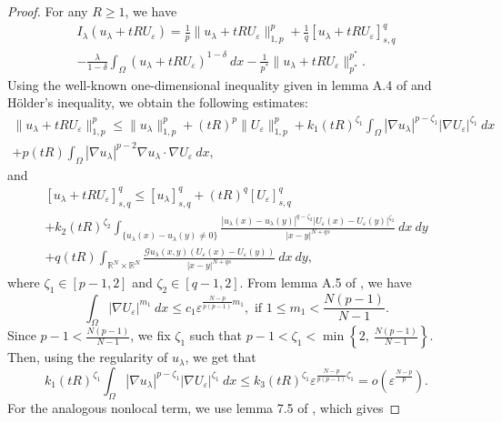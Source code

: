 \documentclass[reqno,oneside]{amsart}
\theoremstyle{definition}
\theoremstyle{remark}
\numberwithin{equation}{section}
\newcommand{\Om} {\Omega}
\newcommand{\sr}{\mathbb{R}}
\newcommand{\na} {\nabla}
\newcommand{\ue}{U_{\varepsilon}}
\newcommand{\la} {\lambda}
\begin{document}
\begin{proof}
    For any $R\geq 1$, we have
    \begin{multline}\label{big_expression}
        I_{\la} \left( u_{\la} + tR\ue\right) = \frac{1}{p} \| u_{\la} + tR\ue\|_{1,p}^p + \frac{1}{q} [u_{\la} + tR\ue ]_{s,q}^q\\
        - \frac{\la}{1-\delta} \int_{\Om} (u_{\la} + tR\ue)^{1-\delta}\ dx - \frac{1}{p^*} \|u_{\la} + tR\ue\|_{p^*}^{p^*}.
    \end{multline}
    Using the well-known one-dimensional inequality given in lemma A.4 of \cite{garciaperal1994critical} and H\"older's inequality, we obtain the following estimates:
    \begin{multline}\label{sub_1}
        \|u_{\la} + tR\ue\|_{1,p}^p \leq \|u_{\la}\|_{1,p}^p + (tR)^p \|\ue\|_{1,p}^p + k_1 (tR)^{\zeta_1} \int_{\Om} |\na u_{\la}|^{p-\zeta_1} |\na \ue |^{\zeta_1}\ dx\\
        + p (tR) \int_{\Om} |\na u_{\la}|^{p-2} \na u_{\la} \cdot \na \ue\ dx,
    \end{multline}
    and
    \begin{multline}\label{sub_2}
        [u_{\la} + tR\ue]_{s,q}^q \leq [u_{\la}]_{s,q}^q + (tR)^q [\ue]_{s,q}^q\\
        + k_2 (tR)^{\zeta_2} \int_{\{u_{\la}(x) - u_{\la}(y) \not= 0\}} \frac{|u_{\la} (x) - u_{\la} (y)|^{q-\zeta_2} |\ue (x) - \ue (y)|^{\zeta_2}}{|x-y|^{N+qs}}\ dx\ dy \\
        + q (tR) \int_{\sr^N \times \sr^N} \frac{\mathcal{G} u_{\la} (x,y) \left( \ue (x) - \ue (y) \right)}{|x-y|^{N+qs}}\ dx\ dy,
    \end{multline}
    where $\zeta_1 \in [p-1, 2]$ and $\zeta_2 \in [q-1,2]$. From lemma A.5 of \cite{garciaperal1994critical}, we have
    \[\int_{\Om} |\na \ue|^{m_1}\ dx \leq c_1 \varepsilon^{\frac{N-p}{p(p-1)}m_1}, \text{ if } 1\leq m_1 < \frac{N(p-1)}{N-1}. \]
    Since $p-1 < \frac{N(p-1)}{N-1}$, we fix $\zeta_1$ such that $p-1 < \zeta_1 < \min \left\{ 2,\ \frac{N(p-1)}{N-1} \right\}$. Then, using the regularity of $u_{\la}$, we get that
    \begin{equation}\label{sub_3}
        k_1 (tR)^{\zeta_1} \int_{\Om} |\na u_{\la}|^{p-\zeta_1} |\na \ue |^{\zeta_1}\ dx \leq k_3 (tR)^{\zeta_1} \varepsilon^{\frac{N-p}{p(p-1)}\zeta_1} = o\left( \varepsilon^{\frac{N-p}{p}} \right).
    \end{equation}
    For the analogous nonlocal term, we use lemma 7.5 of \cite{dhanya2025multiplicityresultsmixedlocal}, which gives

\end{proof}
\end{document}
